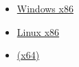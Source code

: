 \begin{itemize}
\item \href{http://go.yurichev.com/17209}{Windows x86}
\item \href{http://go.yurichev.com/17210}{Linux x86}
\item \href{http://go.yurichev.com/17211}{\MacOSX (x64)}
\end{itemize}


